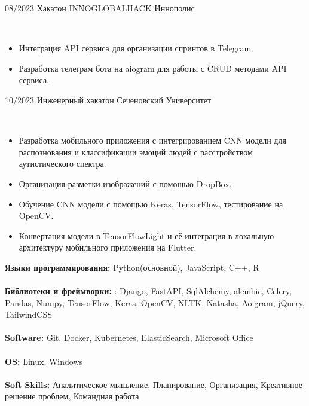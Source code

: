 \documentclass[9pt]{developercv}
\begin{document}
\vspace{-10 pt}
\begin{entrylist}
	\entry
        {08/2023}
		{Хакатон INNOGLOBALHACK}
		{Иннополис}
		{\vspace{-10pt} \\
                    \begin{itemize}[nolistsep, leftmargin=-2cm]
                \item Интеграция API сервиса для организации спринтов в Telegram.
                \item Разработка телеграм бота на aiogram для работы с CRUD методами API сервиса. 
            \end{itemize}}
        \entry
        {10/2023}
        {Инженерный хакатон}
        {Сеченовский Университет}
        {\vspace{-10pt} \\
                    \begin{itemize}[nolistsep, leftmargin=-2cm]
                \item Разработка мобильного приложения с интегрированием CNN модели для распознования и классификации эмоций людей
с расстройством аутистического спектра.

                \item Организация разметки изображений с помощью DropBox.
                \item Обучение CNN модели с помощью Keras, TensorFlow, тестирование на OpenCV.

                \item Конвертация модели в TensorFlowLight и её интеграция в локальную архитектуру мобильного приложения на Flutter.

            \end{itemize}}
\end{entrylist}

\vspace{-10 pt}
\textbf{Языки программирования:} {Python(основной), JavaScript, C++, R
}\\\\
\textbf{Библиотеки и фреймворки:} {: Django, FastAPI, SqlAlchemy, alembic, Celery, Pandas, Numpy, TensorFlow, Keras,
OpenCV, NLTK, Natasha, Aoigram, jQuery, TailwindCSS}\\\\
\textbf{Software:} { Git, Docker, Kubernetes, ElasticSearch, Microsoft Office}\\\\
\textbf{OS:} {Linux, Windows
}\\\\
\textbf{Soft Skills:} {Аналитическое мышление, Планирование, Организация, Креативное решение проблем, Командная
работа}\\
\end{document}
